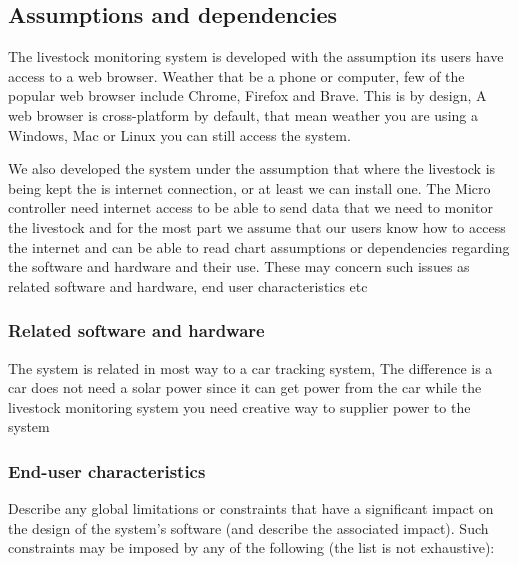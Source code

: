 \subsection{Assumptions and dependencies}

The livestock monitoring system is developed with the assumption its users
have access to a web browser. Weather that be a phone or computer, few of the
popular web browser include Chrome, Firefox and Brave. This is by design, A web
browser is cross-platform by default, that mean weather you are using a
Windows, Mac or Linux you can still access the system.

We also developed the system under the assumption that where the livestock
is being kept the is internet connection, or at least we can install one. The
Micro controller need internet access to be able to send data that we need to
monitor the livestock and for the most part we assume that our users know how
to access the internet and can be able to read chart assumptions or dependencies regarding the software and hardware and their use. These may concern such issues as related software and hardware, end user characteristics etc

\subsubsection{Related software and hardware}

The system is related in most way to a car tracking system, The difference is a
car does not need a solar power since it can get power from the car while
the livestock monitoring system  you need creative way to supplier power to the
system

\subsubsection{End-user characteristics}

Describe any global limitations or constraints that have a significant impact
on the design of the system's software (and describe the associated impact).
Such constraints may be imposed by any of the following (the list is not
exhaustive):


